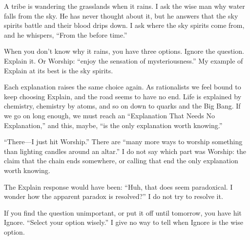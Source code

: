 
A tribe is wandering the grasslands when it rains. I ask the wise man why water falls from the sky. He has never thought about it, but he answers that the sky spirits battle and their blood drips down. I ask where the sky spirits come from, and he whispers, ``From the before time.'' 

When you don't know why it rains, you have three options. Ignore the question. Explain it. Or Worship: ``enjoy the sensation of mysteriousness.'' My example of Explain at its best is the sky spirits.

Each explanation raises the same choice again. As rationalists we feel bound to keep choosing Explain, and the road seems to have no end. Life is explained by chemistry, chemistry by atoms, and so on down to quarks and the Big Bang. If we go on long enough, we must reach an ``Explanation That Needs No Explanation,'' and this, maybe, ``is the only explanation worth knowing.''

``There---I just hit Worship.'' There are ``many more ways to worship something than lighting candles around an altar.'' I do not say which part was Worship: the claim that the chain ends somewhere, or calling that end the only explanation worth knowing. 

The Explain response would have been: ``Huh, that does seem paradoxical. I wonder how the apparent paradox is resolved?'' I do not try to resolve it. 

If you find the question unimportant, or put it off until tomorrow, you have hit Ignore. ``Select your option wisely.'' I give no way to tell when Ignore is the wise option.
